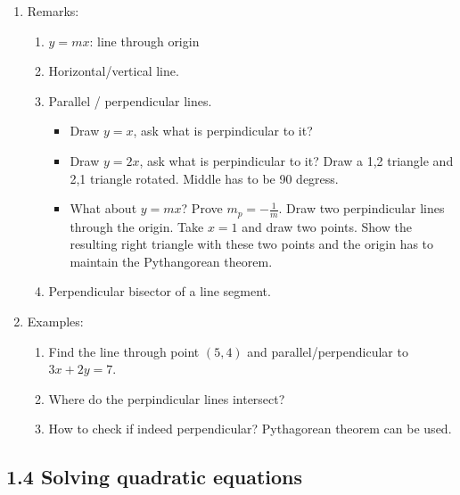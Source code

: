 \documentclass{article}
\begin{document}
\begin{enumerate}
\item Remarks:
\begin{enumerate}
\item $y = mx$: line through origin
\item Horizontal/vertical line.
\item Parallel / perpendicular lines.
\begin{itemize}
\item Draw $y=x$, ask what is perpindicular to it?
\item Draw $y=2x$, ask what is perpindicular to it? Draw a 1,2 triangle and 2,1 triangle rotated. Middle has to be 90 degress.
\item What about $y=mx$? Prove $m_p = -\frac{1}{m}$. Draw two perpindicular lines through the origin. Take $x=1$ and draw two points. Show the resulting right triangle with these two points and the origin has to maintain the Pythangorean theorem.
\end{itemize}
\item Perpendicular bisector of a line segment.
\end{enumerate}

\item Examples:
\begin{enumerate}
\item Find the line through point $(5,4)$ and parallel/perpendicular to $3x+2y=7$.
\item Where do the perpindicular lines intersect?
\item How to check if indeed perpendicular? Pythagorean theorem can be used. 
\end{enumerate}
\end{enumerate}


\subsection{1.4 Solving quadratic equations}
\end{document}

